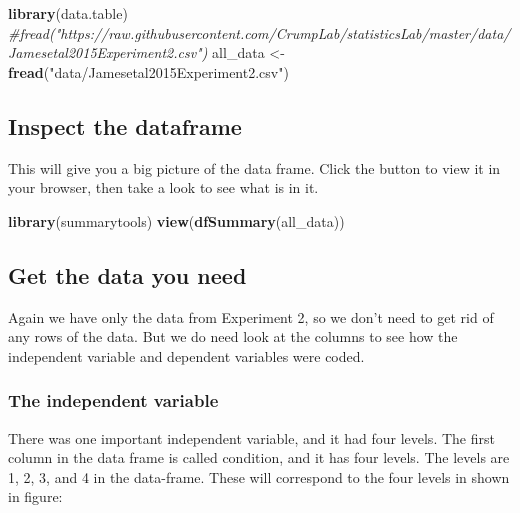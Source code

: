 \documentclass[
]{book}
\newenvironment{Shaded}{\begin{snugshade}}{\end{snugshade}}
\newcommand{\CommentTok}[1]{\textcolor[rgb]{0.56,0.35,0.01}{\textit{#1}}}
\newcommand{\FunctionTok}[1]{\textcolor[rgb]{0.13,0.29,0.53}{\textbf{#1}}}
\newcommand{\NormalTok}[1]{#1}
\newcommand{\OtherTok}[1]{\textcolor[rgb]{0.56,0.35,0.01}{#1}}
\newcommand{\StringTok}[1]{\textcolor[rgb]{0.31,0.60,0.02}{#1}}
\begin{document}
\begin{Shaded}
\begin{Highlighting}[]
\FunctionTok{library}\NormalTok{(data.table)}
\CommentTok{\#fread("https://raw.githubusercontent.com/CrumpLab/statisticsLab/master/data/Jamesetal2015Experiment2.csv")}
\NormalTok{all\_data }\OtherTok{\textless{}{-}} \FunctionTok{fread}\NormalTok{(}\StringTok{"data/Jamesetal2015Experiment2.csv"}\NormalTok{)}
\end{Highlighting}
\end{Shaded}

\hypertarget{inspect-the-dataframe}{%
\subsection{Inspect the dataframe}\label{inspect-the-dataframe}}

This will give you a big picture of the data frame. Click the button to view it in your browser, then take a look to see what is in it.

\begin{Shaded}
\begin{Highlighting}[]
\FunctionTok{library}\NormalTok{(summarytools)}
\FunctionTok{view}\NormalTok{(}\FunctionTok{dfSummary}\NormalTok{(all\_data))}
\end{Highlighting}
\end{Shaded}

\hypertarget{get-the-data-you-need}{%
\subsection{Get the data you need}\label{get-the-data-you-need}}

Again we have only the data from Experiment 2, so we don't need to get rid of any rows of the data. But we do need look at the columns to see how the independent variable and dependent variables were coded.

\hypertarget{the-independent-variable}{%
\subsubsection{The independent variable}\label{the-independent-variable}}

There was one important independent variable, and it had four levels. The first column in the data frame is called condition, and it has four levels. The levels are 1, 2, 3, and 4 in the data-frame. These will correspond to the four levels in shown in figure:
\end{document}

